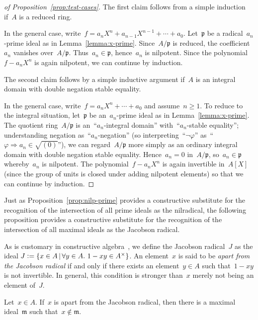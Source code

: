 \documentclass[envcountsect,envcountsame,runningheads]{llncs}
\newcommand{\mmm}{\mathfrak{m}}
\newcommand{\ppp}{\mathfrak{p}}
\newcommand{\defeq}{\vcentcolon=}
\renewcommand{\_}{\mathpunct{.}\,}
\begin{document}
\begin{proof}[of Proposition~\ref{prop:test-cases}]
The first claim follows from a simple induction if~$A$ is a reduced
ring.

In the general case, write~$f = a_n X^n + a_{n-1} X^{n-1} + \cdots + a_0$. Let~$\ppp$
be a radical~$a_n$-prime ideal as in Lemma~\ref{lemma:x-prime}. Since~$A/\ppp$
is reduced, the coefficient~$a_n$ vanishes over~$A/\ppp$. Thus~$a_n \in \ppp$,
hence~$a_n$ is nilpotent. Since the polynomial~$f - a_n X^n$ is again
nilpotent, we can continue by induction.

The second claim follows by a simple inductive argument if~$A$ is an
integral domain with double negation stable equality.

In the general case, write~$f = a_n X^n + \cdots + a_0$
and assume~$n \geq 1$. To reduce to the integral situation, let~$\ppp$ be
an~$a_n$-prime ideal as in Lemma~\ref{lemma:x-prime}. The quotient
ring~$A/\ppp$ is an~``$a_n$-integral domain'' with~``$a_n$-stable equality'';
understanding negation as~``$a_n$-negation'' (so interpreting~``$\neg\varphi$''
as~``$\varphi \Rightarrow a_n \in \sqrt{(0)}$''), we can regard~$A/\ppp$ more
simply as an ordinary integral domain with double negation stable equality.
Hence~$a_n = 0$ in~$A/\ppp$, so~$a_n \in \ppp$ whereby~$a_n$ is nilpotent. The
polynomial~$f - a_n X^n$ is again invertible in~$A[X]$ (since the group of
units is closed under adding nilpotent elements) so that we can continue by
induction.
\end{proof}

Just as Proposition~\ref{prop:nilp-prime} provides a constructive substitute
for the recognition of the intersection of all prime ideals as the nilradical,
the following proposition provides a constructive substitute for the
recognition of the intersection of all maximal ideals as the Jacobson radical.

As is customary in constructive
algebra~\cite[Section~IX.1]{lombardi-quitte:constructive-algebra}, we define
the Jacobson radical~$J$ as the ideal
$J \defeq \{ x \in A \,|\, \forall y \in A\_ 1 - xy \in A^\times \}$.
An element~$x$ is said to be \emph{apart from the Jacobson radical} if and only if
there exists an element~$y \in A$ such that~$1-xy$ is not invertible. In
general, this condition is stronger than~$x$ merely not being an element of~$J$.

\begin{proposition}Let~$x \in A$. If~$x$ is apart from the Jacobson radical, then
there is a maximal ideal~$\mmm$ such that~$x \not\in \mmm$.
\end{proposition}
\end{document}
